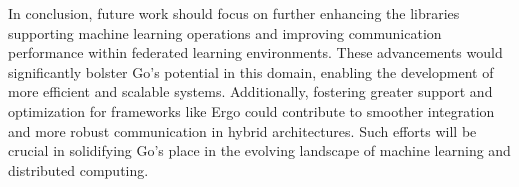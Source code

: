 In conclusion, future work should focus on further enhancing the libraries supporting machine learning operations and improving communication performance within federated learning environments. These advancements would significantly bolster Go's potential in this domain, enabling the development of more efficient and scalable systems. Additionally, fostering greater support and optimization for frameworks like Ergo could contribute to smoother integration and more robust communication in hybrid architectures. Such efforts will be crucial in solidifying Go's place in the evolving landscape of machine learning and distributed computing.
